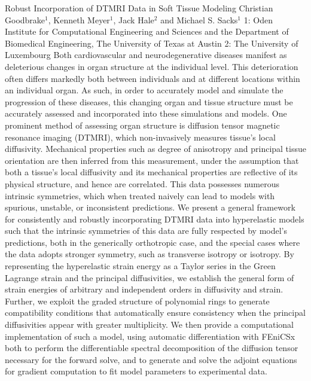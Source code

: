 \vspace{1.5ex}
\abs
{Robust Incorporation of DTMRI Data in Soft Tissue Modeling}
{Christian Goodbrake$^{1}$, Kenneth Meyer$^{1}$, Jack Hale$^{2}$ and Michael S. Sacks$^{1}$}
{1: Oden Institute for Computational Engineering and Sciences and the Department of Biomedical Engineering, The University of Texas at Austin 2: The University of Luxembourg}
{Both cardiovascular and neurodegenerative diseases manifest as deleterious changes in organ structure at the individual level. This deterioration often differs markedly both between individuals and at different locations within an individual organ. As such, in order to accurately model and simulate the progression of these diseases, this changing organ and tissue structure must be accurately assessed and incorporated into these simulations and models. One prominent method of assessing organ structure is diffusion tensor magnetic resonance imaging (DTMRI), which non-invasively measures tissue’s local diffusivity. Mechanical properties such as degree of anisotropy and principal tissue orientation are then inferred from this measurement, under the assumption that both a tissue’s local diffusivity and its mechanical properties are reflective of its physical structure, and hence are correlated. This data possesses numerous intrinsic symmetries, which when treated naively can lead to models with spurious, unstable, or inconsistent predictions. We present a general framework for consistently and robustly incorporating DTMRI data into hyperelastic models such that the intrinsic symmetries of this data are fully respected by model’s predictions, both in the generically orthotropic case, and the special cases where the data adopts stronger symmetry, such as transverse isotropy or isotropy. By representing the hyperelastic strain energy as a Taylor series in the Green Lagrange strain and the principal diffusivities, we establish the general form of strain energies of arbitrary and independent orders in diffusivity and strain. Further, we exploit the graded structure of polynomial rings to generate compatibility conditions that automatically ensure consistency when the principal diffusivities appear with greater multiplicity. We then provide a computational implementation of such a model, using automatic differentiation with FEniCSx both to perform the differentiable spectral decomposition of the diffusion tensor necessary for the forward solve, and to generate and solve the adjoint equations for gradient computation to fit model parameters to experimental data.}


